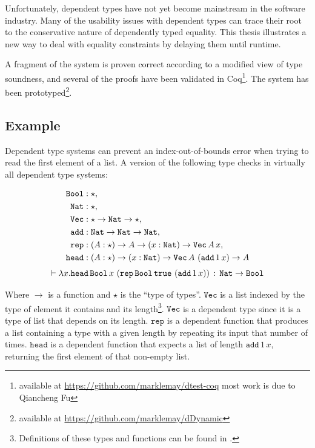 Unfortunately, dependent types have not yet become mainstream in the software industry.
Many of the usability issues with dependent types can trace their root to the conservative nature of dependently typed equality.
This thesis illustrates a new way to deal with equality constraints by delaying them until runtime.

A fragment of the system is proven correct according to a modified view of type soundness, and several of the proofs have been validated in Coq\footnote{
available at \url{https://github.com/marklemay/dtest-coq} most work is due to Qiancheng Fu}.
The system has been prototyped\footnote{available at \url{https://github.com/marklemay/dDynamic}}.


\subsection{Example}

Dependent type systems can prevent an index-out-of-bounds error when trying to read the first element of a list.
A version of the following type checks in virtually all dependent type systems:


\begin{align*}
\mathtt{Bool} & : \star,\\
\mathtt{Nat}{}  & : \star,\\
\mathtt{Vec} & :\star \rightarrow\mathtt{Nat}{} \rightarrow \star,\\
\mathtt{add} & :\mathtt{Nat}{} \rightarrow\mathtt{Nat}{} \rightarrow\mathtt{Nat}{} ,\\
\mathtt{rep} & :\left(A:\star\right)\rightarrow A\rightarrow\left(x:\mathtt{Nat}{} \right)\rightarrow\mathtt{Vec\,}A\,x,\\
\mathtt{head} & :\left(A:\star\right)\rightarrow\left(x:\mathtt{Nat}{} \right)\rightarrow\mathtt{Vec}\,A\,\left(\mathtt{add}\,1\,x\right)\rightarrow A
\end{align*}
\[
\vdash\lambda x.\mathtt{head}\,\mathtt{Bool}\,x\,\left(\mathtt{rep}\,\mathtt{Bool}\,\mathtt{true}\,\left(\mathtt{add}\,1\,x\right)\right)\,:\,\mathtt{Nat}{} \rightarrow\mathtt{Bool}
\]


Where $\rightarrow$ is a function and $\star$ is the ``type of types''.
$\mathtt{Vec}$ is a list indexed by the type of element it contains and its length\footnote{
  Definitions of these types and functions can be found in .
}.
$\mathtt{Vec}$ is a dependent type since it is a type of list that depends on its length.
$\mathtt{rep}$ is a dependent function that produces a list containing a type with a given length by repeating its input that number of times.
$\mathtt{head}$ is a dependent function that expects a list of length $\mathtt{add}\,1\,x$, returning the first element of that non-empty list.

